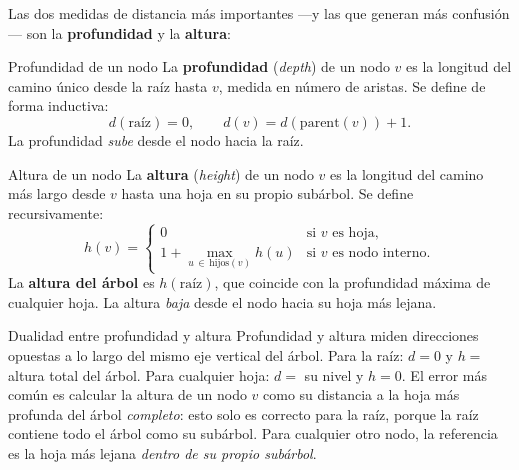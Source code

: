 Las dos medidas de distancia más importantes —y las que generan más confusión— son la
\textbf{profundidad} y la \textbf{altura}:

\begin{definicion}{Profundidad de un nodo}
La \textbf{profundidad} (\textit{depth}) de un nodo $v$ es la longitud del camino único
desde la raíz hasta $v$, medida en número de aristas. Se define de forma inductiva:
\[
    d(\mathrm{raíz}) = 0, \qquad d(v) = d(\mathrm{parent}(v)) + 1.
\]
La profundidad \emph{sube} desde el nodo hacia la raíz.
\end{definicion}

\begin{definicion}{Altura de un nodo}
La \textbf{altura} (\textit{height}) de un nodo $v$ es la longitud del camino más largo
desde $v$ hasta una hoja en su propio subárbol. Se define recursivamente:
\[
    h(v) =
    \begin{cases}
        0 & \text{si } v \text{ es hoja,} \\[4pt]
        1 + \displaystyle\max_{u \,\in\, \mathrm{hijos}(v)} h(u) & \text{si } v
        \text{ es nodo interno.}
    \end{cases}
\]
La \textbf{altura del árbol} es $h(\mathrm{raíz})$, que coincide con la profundidad
máxima de cualquier hoja. La altura \emph{baja} desde el nodo hacia su hoja más lejana.
\end{definicion}

\begin{observacion}{Dualidad entre profundidad y altura}
Profundidad y altura miden direcciones opuestas a lo largo del mismo eje vertical del árbol.
Para la raíz: $d = 0$ y $h = $ altura total del árbol. Para cualquier hoja: $d = $ su nivel
y $h = 0$. El error más común es calcular la altura de un nodo $v$ como su distancia a la
hoja más profunda del árbol \emph{completo}: esto solo es correcto para la raíz, porque la
raíz contiene todo el árbol como su subárbol. Para cualquier otro nodo, la referencia es
la hoja más lejana \emph{dentro de su propio subárbol}.
\end{observacion}

